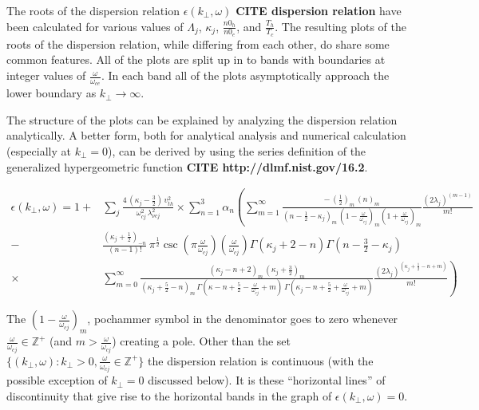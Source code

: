 \documentclass[12pt,a4paper]{article}
\begin{document}
    The roots of the dispersion relation $\epsilon(k_\perp, \omega)$ \textbf{CITE dispersion relation} have been calculated for various values of $\Lambda_j$, $\kappa_j$, $\frac{n0_h}{n0_e}$, and $\frac{T_h}{T_c}$.
    The resulting plots of the roots of the dispersion relation, while differing from each other, do share some common features.
    All of the plots are split up in to bands with boundaries at integer values of $\frac{\omega}{\omega_{ce}}$.
    In each band all of the plots asymptotically approach the lower boundary as $k_\perp \rightarrow \infty$.

    The structure of the plots can be explained by analyzing the dispersion relation analytically.
    A better form, both for analytical analysis and numerical calculation (especially at $k_\perp = 0$), can be derived by using the series definition of the generalized hypergeometric function \textbf{CITE http://dlmf.nist.gov/16.2}.

    \begin{align}
        \nonumber \epsilon(k_\perp, \omega) = 1 +& \sum_j \frac{4 \, (\kappa_j - \frac{3}{2}) \, v^2_{th}}{\omega^2_{cj} \, \lambda^2_{\nu c j}} \times \sum_{n = 1}^3 \alpha_n \left( \sum_{m = 1}^\infty \frac{ -\, (\frac{1}{2})_m \, (n)_m }{(n - \frac{1}{2} - \kappa_j)_m \, (1 - \frac{\omega}{\omega_{cj}})_m (1 + \frac{\omega}{\omega_{cj}})_m } \frac{(2 \lambda_j)^{(m - 1)}}{m!} \right. \\
        \nonumber -& \left. \frac{(\kappa_j + \frac{1}{2})_{-n}}{(n - 1)!} \, \pi^{\frac{1}{2}} \csc\left(\pi \frac{\omega}{\omega_{cj}}\right) \left(\frac{\omega}{\omega_{cj}}\right) \Gamma(\kappa_j + 2 - n) \Gamma(n - \frac{3}{2} - \kappa_j) \right.\\
        \times& \left. \sum_{m = 0}^\infty \frac{(\kappa_j - n + 2)_m \, (\kappa_j + \frac{3}{2})_m}{(\kappa_j + \frac{5}{2} - n)_m \, \Gamma(\kappa - n + \frac{5}{2} - \frac{\omega}{\omega_{cj}} + m) \, \Gamma(\kappa_j - n + \frac{5}{2} + \frac{\omega}{\omega_{cj}} + m)} \frac{(2 \lambda_j)^{(\kappa_j + \frac{1}{2} - n + m)}}{m!} \right)
    \end{align}

    The $(1 - \frac{\omega}{\omega_{cj}})_m$, pochammer symbol in the denominator goes to zero whenever $\frac{\omega}{\omega_{cj}} \in \mathbb{Z}^+$ (and $m > \frac{\omega}{\omega_{cj}}$) creating a pole.
    Other than the set $\{(k_\perp, \omega) : k_\perp > 0, \frac{\omega}{\omega_{cj}} \in \mathbb{Z}^+\}$ the dispersion relation is continuous (with the possible exception of $k_\perp = 0$ discussed below).
    It is these ``horizontal lines'' of discontinuity that give rise to the horizontal bands in the graph of $\epsilon(k_\perp, \omega) = 0$.
\end{document}
